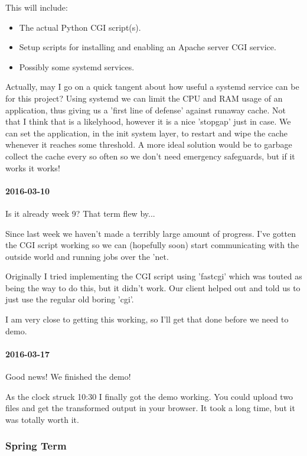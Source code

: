This will include:

\begin{itemize}
  \item The actual Python CGI script(s).
  \item Setup scripts for installing and enabling an Apache server CGI service.
  \item Possibly some systemd services.
\end{itemize}

Actually, may I go on a quick tangent about how useful a systemd service can be for this project? Using systemd we can limit the CPU and RAM usage of an application, thus giving us a 'first line of defense' against runaway cache.
Not that I think that is a likelyhood, however it is a nice 'stopgap' just in case.
We can set the application, in the init system layer, to restart and wipe the cache whenever it reaches some threshold.
A more ideal solution would be to garbage collect the cache every so often so we don't need emergency safeguards, but if it works it works!

\paragraph{2016-03-10}

Is it already week 9? That term flew by...

Since last week we haven't made a terribly large amount of progress.
I've gotten the CGI script working so we can (hopefully soon) start communicating with the outside world and running jobs over the 'net.

Originally I tried implementing the CGI script using 'fastcgi' which was touted as being the way to do this, but it didn't work.
Our client helped out and told us to just use the regular old boring 'cgi'.

I am very close to getting this working, so I'll get that done before we need to demo.

\paragraph{2016-03-17}

Good news! We finished the demo!

As the clock struck 10:30 I finally got the demo working.
You could upload two files and get the transformed output in your browser.
It took a long time, but it was totally worth it.

\subsubsection{Spring Term}

